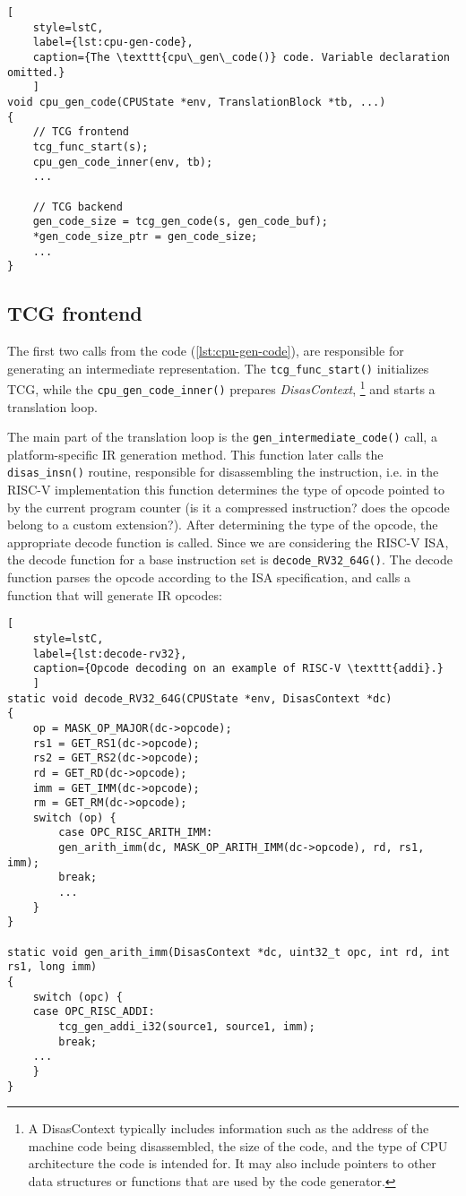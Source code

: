 \nopagebreak[4]
\begin{lstlisting}[
    style=lstC,
    label={lst:cpu-gen-code},
    caption={The \texttt{cpu\_gen\_code()} code. Variable declaration omitted.}
    ]
void cpu_gen_code(CPUState *env, TranslationBlock *tb, ...)
{
    // TCG frontend
    tcg_func_start(s);
    cpu_gen_code_inner(env, tb);
    ...

    // TCG backend
    gen_code_size = tcg_gen_code(s, gen_code_buf);
    *gen_code_size_ptr = gen_code_size;
    ...
}
\end{lstlisting}

\pagebreak
\subsection{TCG frontend}
\label{sec:tcg-frontend}

The first two calls from the code (\ref{lst:cpu-gen-code}), are responsible for generating an intermediate
representation. The \texttt{tcg\_func\_start()} initializes TCG, while the \texttt{cpu\_gen\_code\_inner()} prepares
\textit{DisasContext},%
\footnote{A DisasContext typically includes information such as the address of the machine code being disassembled,
the size of the code, and the type of CPU architecture the code is intended for. It may also include pointers to other
data structures or functions that are used by the code generator.}
and starts a translation loop.

The main part of the translation loop is the \texttt{gen\_intermediate\_code()} call, a platform-specific
IR generation method. This function later calls the \texttt{disas\_insn()} routine, responsible for disassembling
the instruction, i.e. in the RISC-V implementation this function determines the type of opcode pointed to by the current
program counter (is it a compressed instruction? does the opcode belong to a custom extension?). After determining
the type of the opcode, the appropriate decode function is called. Since we are considering the RISC-V ISA, the decode function for a base instruction set
is \texttt{decode\_RV32\_64G()}. The decode function parses the opcode according to the ISA specification, and calls a
function that will generate IR opcodes:

\begin{lstlisting}[
    style=lstC,
    label={lst:decode-rv32},
    caption={Opcode decoding on an example of RISC-V \texttt{addi}.}
    ]
static void decode_RV32_64G(CPUState *env, DisasContext *dc)
{
    op = MASK_OP_MAJOR(dc->opcode);
    rs1 = GET_RS1(dc->opcode);
    rs2 = GET_RS2(dc->opcode);
    rd = GET_RD(dc->opcode);
    imm = GET_IMM(dc->opcode);
    rm = GET_RM(dc->opcode);
    switch (op) {
        case OPC_RISC_ARITH_IMM:
        gen_arith_imm(dc, MASK_OP_ARITH_IMM(dc->opcode), rd, rs1, imm);
        break;
        ...
    }
}

static void gen_arith_imm(DisasContext *dc, uint32_t opc, int rd, int rs1, long imm)
{
    switch (opc) {
    case OPC_RISC_ADDI:
        tcg_gen_addi_i32(source1, source1, imm);
        break;
    ...
    }
}
\end{lstlisting}


